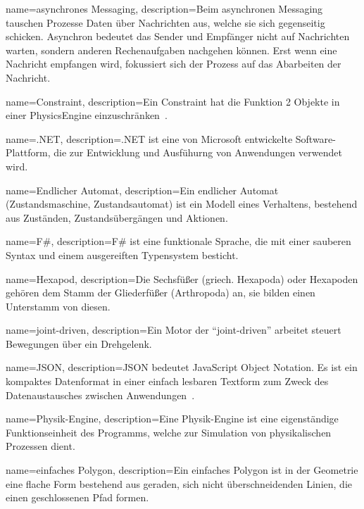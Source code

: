 %
%


%
%

%
%
{
  name={asynchrones Messaging},
  description={Beim asynchronen Messaging tauschen Prozesse Daten über Nachrichten aus,
    welche sie sich gegenseitig schicken.
    Asynchron bedeutet das Sender und Empfänger nicht auf Nachrichten warten,
    sondern anderen Rechenaufgaben nachgehen können.
    Erst wenn eine Nachricht empfangen wird, fokussiert sich der Prozess auf das Abarbeiten der Nachricht.}
}

{
  name={Constraint},
  description={Ein Constraint hat die Funktion 2 Objekte in einer \gls{PhysicsEngine} einzuschränken~\cite{gamedev:constraints}.}
}

{
  name={.NET},
  description={.NET ist eine von Microsoft entwickelte Software-Plattform,
    die zur Entwicklung und Ausfühurng von Anwendungen verwendet wird.}
}

{
  name={Endlicher Automat},
  description={Ein endlicher Automat (Zustandsmaschine, Zustandsautomat) ist ein Modell eines Verhaltens,
    bestehend aus Zuständen, Zustandsübergängen und Aktionen.}
}

{
  name={F\#},
  description={F\# ist eine funktionale Sprache,
    die mit einer sauberen Syntax und einem ausgereiften Typensystem besticht.}
}

{
  name={Hexapod},
  description={Die Sechsfüßer (griech. Hexapoda) oder Hexapoden
    gehören dem Stamm der Gliederfüßer (Arthropoda) an,
    sie bilden einen Unterstamm von diesen.}
}

{
  name={joint-driven},
  description={Ein Motor der ``joint-driven'' arbeitet steuert Bewegungen über ein Drehgelenk.}
}

{
  name={JSON},
  description={JSON bedeutet JavaScript Object Notation.
    Es ist ein kompaktes Datenformat in einer einfach lesbaren Textform
    zum Zweck des Datenaustausches zwischen Anwendungen~\cite{json}.}
}

{
  name={Physik-Engine},
  description={Eine Physik-Engine ist eine eigenständige Funktionseinheit des Programms,
    welche zur Simulation von physikalischen Prozessen dient.}
}

{
  name={einfaches Polygon},
  description={Ein einfaches Polygon ist in der Geometrie eine flache Form bestehend aus geraden,
    sich nicht überschneidenden Linien, die einen geschlossenen Pfad formen.}
}
